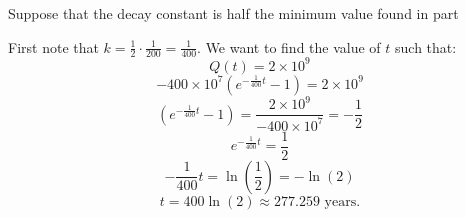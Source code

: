 \documentclass[nooutcomes]{ximera}
\renewenvironment{freeResponse}{
\ifhandout\setbox0\vbox\bgroup\else
\begin{trivlist}\item[\hskip \labelsep\bfseries Solution:\hspace{2ex}]
\fi}
{\ifhandout\egroup\else
\end{trivlist}
\fi}
\begin{document}
\begin{problem}
\begin{enumerate}
		
		
	\item  Suppose that the decay constant is half the minimum value found in part %
		\begin{freeResponse}
		First note that $k = \frac{1}{2} \cdot \frac{1}{200} = \frac{1}{400}$.  
		We want to find the value of $t$ such that:
			\begin{equation*}
			Q(t) = 2 \times 10^9
			\end{equation*}
			\begin{equation*}
			- 400 \times 10^7 \left(e^{-\frac{1}{400}t}-1 \right) = 2 \times 10^9
			\end{equation*}
			\begin{equation*}
			\left(e^{-\frac{1}{400}t}-1 \right) = \frac{2 \times 10^9}{-400 \times 10^7} = - \frac{1}{2}
			\end{equation*}
			\begin{equation*}
			e^{-\frac{1}{400}t} = \frac{1}{2}
			\end{equation*}
			\begin{equation*}
			-\frac{1}{400}t=\ln \left(\frac{1}{2} \right) = -\ln(2)
			\end{equation*}
			\begin{equation*}
			t = 400 \ln(2) \approx 277.259 \text{ years}.
			\end{equation*}
		\end{freeResponse}
		
		
		
	\end{enumerate}
		
		
		

\end{problem}



								
				
				
	
\end{document}
